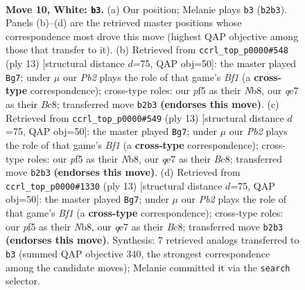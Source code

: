 \documentclass[11pt]{article}
\begin{document}
\clearpage

\begin{figure}[p]\centering
\begin{subfigure}{0.46\textwidth}\centering
\resizebox{\linewidth}{!}{%
\newchessgame
\chessboard[
  setfen={rnbk3r/pppnq1p1/4p3/1N1pPp1p/3P1P2/7N/PPP3PP/R2QKB1R w KQ - 2 10},
  showmover=false,
  pgfstyle=straightmove, color=movearrow, markmove={b2-b3}
]}
\caption{}
\end{subfigure}\hfill
\begin{subfigure}{0.46\textwidth}\centering
\resizebox{\linewidth}{!}{%
\newchessgame
\chessboard[
  setfen={rnbqkb1r/pp3p1p/3p1np1/2pP4/4P3/3B1N2/PP3PPP/RNBQK2R b KQkq - 1 7},
  showmover=false,
  pgfstyle=straightmove, color=movearrow, markmove={f8-g7}
]}
\caption{}
\end{subfigure}
\\[4pt]
\begin{subfigure}{0.46\textwidth}\centering
\resizebox{\linewidth}{!}{%
\newchessgame
\chessboard[
  setfen={rnbqkb1r/pp3p1p/3p1np1/2pP4/4P3/3B1N2/PP3PPP/RNBQK2R b KQkq - 1 7},
  showmover=false,
  pgfstyle=straightmove, color=movearrow, markmove={f8-g7}
]}
\caption{}
\end{subfigure}\hfill
\begin{subfigure}{0.46\textwidth}\centering
\resizebox{\linewidth}{!}{%
\newchessgame
\chessboard[
  setfen={rnbqkb1r/pp3p1p/3p1np1/2pP4/4P3/3B1N2/PP3PPP/RNBQK2R b KQkq - 1 7},
  showmover=false,
  pgfstyle=straightmove, color=movearrow, markmove={f8-g7}
]}
\caption{}
\end{subfigure}
\caption{\textbf{Move 10, White: \texttt{b3}.} (a) Our position; Melanie plays \texttt{b3} (\texttt{b2b3}). Panels (b)--(d) are the retrieved master positions whose correspondence most drove this move (highest QAP objective among those that transfer to it). (b) Retrieved from \texttt{ccrl\_top\_p0000\#548} (ply 13) [structural distance $d$=75, QAP obj=50]: the master played \texttt{Bg7}; under $\mu$ our \emph{Pb2} plays the role of that game's \emph{Bf1} (a \textbf{cross-type} correspondence); cross-type roles: our \emph{p}f5 as their \emph{N}b8, our \emph{q}e7 as their \emph{B}c8; transferred move \texttt{b2b3} \textbf{(endorses this move)}. (c) Retrieved from \texttt{ccrl\_top\_p0000\#549} (ply 13) [structural distance $d$=75, QAP obj=50]: the master played \texttt{Bg7}; under $\mu$ our \emph{Pb2} plays the role of that game's \emph{Bf1} (a \textbf{cross-type} correspondence); cross-type roles: our \emph{p}f5 as their \emph{N}b8, our \emph{q}e7 as their \emph{B}c8; transferred move \texttt{b2b3} \textbf{(endorses this move)}. (d) Retrieved from \texttt{ccrl\_top\_p0000\#1330} (ply 13) [structural distance $d$=75, QAP obj=50]: the master played \texttt{Bg7}; under $\mu$ our \emph{Pb2} plays the role of that game's \emph{Bf1} (a \textbf{cross-type} correspondence); cross-type roles: our \emph{p}f5 as their \emph{N}b8, our \emph{q}e7 as their \emph{B}c8; transferred move \texttt{b2b3} \textbf{(endorses this move)}. Synthesis: 7 retrieved analogs transferred to \texttt{b3} (summed QAP objective 340, the strongest correspondence among the candidate moves); Melanie committed it via the \texttt{search} selector.}
\label{fig:thought-m18}
\end{figure}
\end{document}
